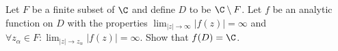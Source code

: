 Let $F$ be a finite subset of $\C$ and define $D$ to be $\C \setminus
F$.  Let $f$ be an analytic function on $D$ with the properties
$\lim_{|z|\rightarrow \infty}|f(z)|=\infty$ and $\forall z_{\alpha}\in
F:\lim_{|z|\rightarrow z_{\alpha}}|f(z)|=\infty$. Show that $f(D)=\C$.

